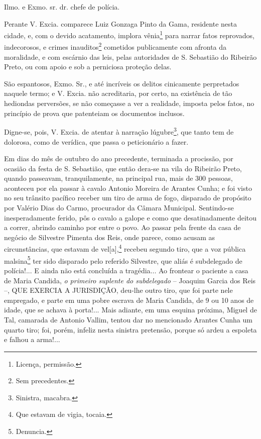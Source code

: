 \asterisc{}

Ilmo. e Exmo. sr. dr. chefe de polícia.

Perante V. Excia. comparece Luiz Gonzaga Pinto da Gama, residente nesta
cidade, e, com o devido acatamento, implora vênia\footnote{ Licença,
  permissão.} para narrar fatos reprovados, indecorosos, e crimes
inauditos\footnote{ Sem precedentes.} cometidos publicamente com
afronta da moralidade, e com escárnio das leis, pelas autoridades de S.
Sebastião do Ribeirão Preto, ou com apoio e sob a perniciosa proteção
delas.

São espantosos, Exmo. Sr., e até incríveis os delitos cinicamente
perpretados naquele termo; e V. Excia. não acreditaria, por certo, na
existência de tão hediondas perversões, se não começasse a ver a
realidade, imposta pelos fatos, no princípio de prova que patenteiam os
documentos inclusos.

Digne-se, pois, V. Excia. de atentar à narração lúgubre\footnote{
  Sinistra, macabra.}, que tanto tem de dolorosa, como de verídica, que
passa o peticionário a fazer.

Em dias do mês de outubro do ano precedente, terminada a procissão, por
ocasião da festa de S. Sebastião, que então dera-se na vila do Ribeirão
Preto, quando passeavam, tranquilamente, na principal rua, mais de 300
pessoas, aconteceu por ela passar à cavalo Antonio Moreira de Arantes
Cunha; e foi visto no seu trânsito pacífico receber um tiro de arma de
fogo, disparado de propósito por Valério Dias do Carmo, procurador da
Câmara Municipal. Sentindo-se inesperadamente ferido, pôs o cavalo a
galope e como que desatinadamente deitou a correr, abrindo caminho por
entre o povo. Ao passar pela frente da casa de negócio de Silvestre
Pimenta dos Reis, onde parece, como acusam as circunstâncias, que
estavam de vel{[}a{]},\footnote{ Que estavam de vigia, tocaia.} recebeu
segundo tiro, que a voz pública malsina\footnote{ Denuncia.} ter sido
disparado pelo referido Silvestre, que aliás é subdelegado de
polícia!... E ainda não está concluída a tragédia... Ao frontear o
paciente a casa de Maria Candida, \emph{o primeiro suplente do
subdelegado} -- Joaquim Garcia dos Reis --, QUE EXERCIA A JURISDIÇÃO,
deu-lhe outro tiro, que foi parte nele empregado, e parte em uma pobre
escrava de Maria Candida, de 9 ou 10 anos de idade, que se achava à
porta!... Mais adiante, em uma esquina próxima, Miguel de Tal, camarada
de Antonio Vallim, tentou dar no mencionado Arantes Cunha um quarto
tiro; foi, porém, infeliz nesta sinistra pretensão, porque só ardeu a
espoleta e falhou a arma!...

